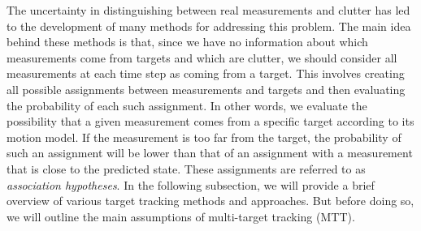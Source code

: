 The uncertainty in distinguishing between real measurements and clutter has led to the development of many methods for addressing this problem. The main idea behind these methods is that, since we have no information about which measurements come from targets and which are clutter, we should consider all measurements at each time step as coming from a target. This involves creating all possible assignments between measurements and targets and then evaluating the probability of each such assignment. In other words, we evaluate the possibility that a given measurement comes from a specific target according to its motion model. If the measurement is too far from the target, the probability of such an assignment will be lower than that of an assignment with a measurement that is close to the predicted state. These assignments are referred to as \textit{association hypotheses}. In the following subsection, we will provide a brief overview of various target tracking methods and approaches. But before doing so, we will outline the main assumptions of multi-target tracking (MTT).
